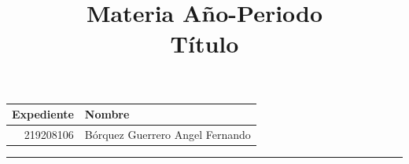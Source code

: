 \documentclass[a4paper, 11pt]{article}
\title
{
    Materia Año-Periodo \\
    Título
}
\begin{document}
\maketitle

\begin{center}
    \begin{tabular}{r|l}
        \textbf{Expediente} & \textbf{Nombre} \\ \hline
        219208106 & Bórquez Guerrero Angel Fernando \\
    \end{tabular}
\end{center}

\rule{\linewidth}{0.3mm}

\vspace{0.3cm}
\begin{enumerate}

\end{enumerate}
\end{document}
